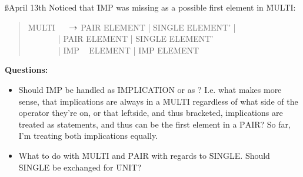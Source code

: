 \documentclass[a4paper]{article}
\begin{document}
\ss{April 13th}
Noticed that \f{IMP} was missing as a possible first element in \f{MULTI}:
\begin{quote}
\ttfamily
MULTI \(~~~~~~\)$\rightarrow$ PAIR \: ELEMENT |
                      SINGLE  ELEMENT' |\\
\(~~~~~~~~~~~~~~~\) | PAIR  ELEMENT  |
                      SINGLE  ELEMENT'\\
\(~~~~~~~~~~~~~~~\) | IMP ~ ELEMENT  |
                      IMP  ELEMENT\\
\end{quote}

{\bf Questions:}\\
\begin{itemize}
    \item Should \f{IMP} be handled as \f{IMPLICATION} or as ? I.e.
    what makes more sense, that implications are always in a \f{MULTI} 
    regardless of what side of the operator they're on, or that leftside,
    and thus bracketed, implications are treated as statements, and thus 
    can be the first element in a \f{PAIR}?
    So far, I'm treating both implications equally.

    \item What to do with \f{MULTI} and \f{PAIR} with regards to \f{SINGLE}.
    Should \f{SINGLE} be exchanged for \f{UNIT}?
\end{itemize}


\label{LastBody}
\end{document}
